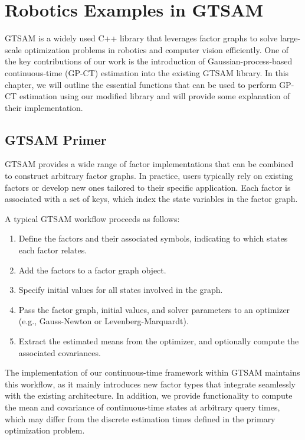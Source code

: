
\chapter{Robotics Examples in GTSAM}

\ac{GTSAM} is a widely used C++ library that leverages factor graphs to solve large-scale optimization problems in robotics and computer vision efficiently. One of the key contributions of our work is the introduction of Gaussian-process-based continuous-time (GP-CT) estimation into the existing \ac{GTSAM} library. In this chapter, we will outline the essential functions that can be used to perform GP-CT estimation using our modified library and will provide some explanation of their implementation.

\section{GTSAM Primer}

\ac{GTSAM} provides a wide range of factor implementations that can be combined to construct arbitrary factor graphs.
In practice, users typically rely on existing factors or develop new ones tailored to their specific application.
Each factor is associated with a set of keys, which index the state variables in the factor graph.

A typical \ac{GTSAM} workflow proceeds as follows:

\begin{enumerate}
	\item Define the factors and their associated symbols, indicating to which states each factor relates.
	\item Add the factors to a factor graph object.
	\item Specify initial values for all states involved in the graph.
	\item Pass the factor graph, initial values, and solver parameters to an optimizer (e.g., Gauss-Newton or Levenberg-Marquardt).
	\item Extract the estimated means from the optimizer, and optionally compute the associated covariances.
\end{enumerate}

The implementation of our continuous-time framework within \ac{GTSAM} maintains this workflow, as it mainly introduces new factor types that integrate seamlessly with the existing architecture.
In addition, we provide functionality to compute the mean and covariance of continuous-time states at arbitrary query times, which may differ from the discrete estimation times defined in the primary optimization problem.

